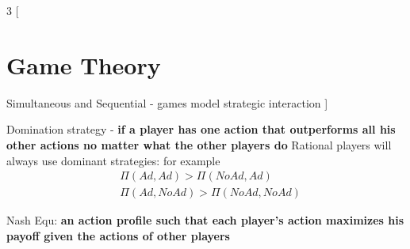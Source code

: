 \documentclass[8pt]{report}
\begin{document}
\begin{multicols}{3}
[
\section{Game Theory}
Simultaneous and Sequential - games model strategic interaction
]

Domination strategy - \textbf{if a player has one action that outperforms all his other actions no matter what the other players do}
Rational players will always use dominant strategies: for example\\
\begin{align*}
&	\Pi(Ad, Ad) > \Pi(NoAd, Ad) \\
&	\Pi(Ad, NoAd) > \Pi(NoAd, NoAd)
\end{align*}

Nash Equ: \textbf{an action profile such that each player's action maximizes his payoff given the actions of other players}

\end{multicols}
\end{document}
